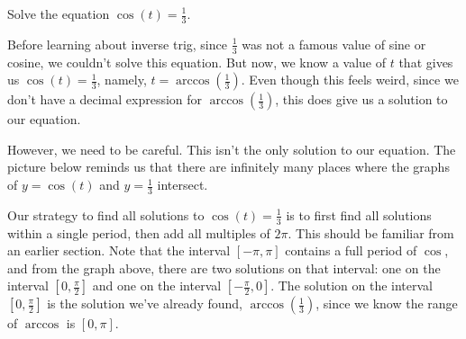 \documentclass{ximera}
\begin{document}
\begin{example}
Solve the equation $\cos(t) = \frac{1}{3}$. 

\begin{explanation}
Before learning about inverse trig, since $\frac{1}{3}$ was not a famous value of sine or cosine, we couldn't solve this equation. But now, we know a value of $t$ that gives us $\cos(t) = \frac{1}{3}$, namely, $t = \arccos\left(\frac{1}{3}\right)$. Even though this feels weird, since we don't have a decimal expression for $\arccos\left(\frac{1}{3}\right)$, this does give us a solution to our equation. 

However, we need to be careful. This isn't the only solution to our equation. The picture below reminds us that there are infinitely many places where the graphs of $y = \cos(t)$ and $y = \frac{1}{3}$ intersect. 
\begin{image}
\end{image}

Our strategy to find all solutions to $\cos(t) = \frac{1}{3}$ is to first find all solutions within a single period, then add all multiples of $2\pi$. This should be familiar from an earlier section. Note that the interval $[-\pi, \pi]$ contains a full period of $\cos$, and from the graph above, there are two solutions on that interval: one on the interval $\left[0, \frac{\pi}{2}\right]$ and one on the interval $\left[-\frac{\pi}{2}, 0\right]$. The solution on the interval $\left[0, \frac{\pi}{2}\right]$ is the solution we've already found, $\arccos\left(\frac{1}{3}\right)$, since we know the range of $\arccos$ is $[0, \pi]$. 


\end{explanation}
\end{example}
\end{document}
